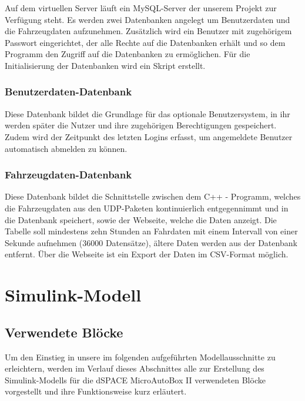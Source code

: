 \documentclass[fontsize = 12pt, paper = a4]{scrreprt}
\begin{document}
Auf dem virtuellen Server läuft ein MySQL-Server der unserem Projekt zur Verfügung steht. Es werden zwei Datenbanken angelegt um Benutzerdaten und die Fahrzeugdaten aufzunehmen. Zusätzlich wird ein Benutzer mit zugehörigem Passwort eingerichtet, der alle Rechte auf die Datenbanken erhält und so dem Programm den Zugriff auf die Datenbanken zu ermöglichen. Für die Initialisierung der Datenbanken wird ein Skript erstellt.

\subsubsection{Benutzerdaten-Datenbank}

Diese Datenbank bildet die Grundlage für das optionale Benutzersystem, in ihr werden später die Nutzer und ihre zugehörigen Berechtigungen gespeichert. Zudem wird der Zeitpunkt des letzten Logins erfasst, um angemeldete Benutzer automatisch abmelden zu können.

\subsubsection{Fahrzeugdaten-Datenbank}

Diese Datenbank bildet die Schnittstelle zwischen dem C++ - Programm, welches die Fahrzeugdaten aus den UDP-Paketen kontinuierlich entgegennimmt und in die Datenbank speichert, sowie der Webseite, welche die Daten anzeigt. Die Tabelle soll mindestens zehn Stunden an Fahrdaten mit einem Intervall von einer Sekunde aufnehmen (36000 Datensätze), ältere Daten werden aus der Datenbank entfernt. Über die Webseite ist ein Export der Daten im CSV-Format möglich. 



\section{Simulink-Modell}
\subsection{Verwendete Blöcke}

Um den Einstieg in unsere im folgenden aufgeführten Modellausschnitte  zu erleichtern, werden im Verlauf dieses Abschnittes alle zur Erstellung des Simulink-Modells für die dSPACE MicroAutoBox II verwendeten Blöcke vorgestellt und ihre Funktionsweise kurz erläutert. 
\end{document}
